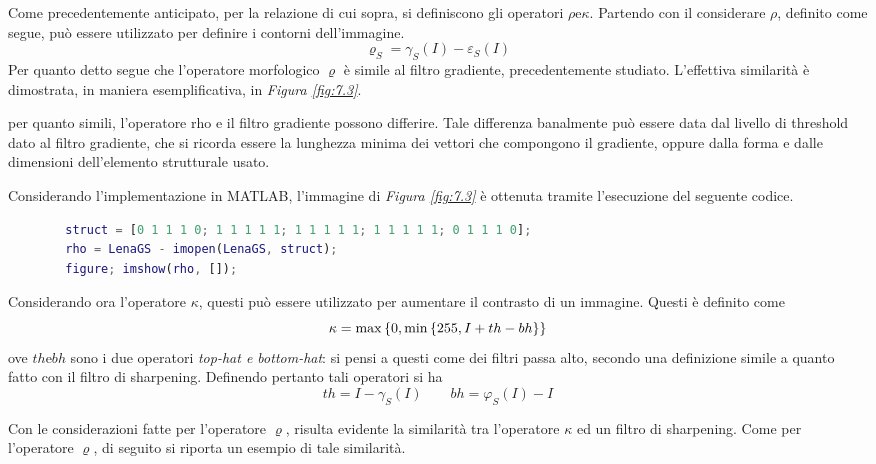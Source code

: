 \documentclass{subfiles}
\begin{document}
Come precedentemente anticipato, per la relazione di cui sopra, si definiscono gli operatori \(\rho \text{e} \kappa\).
Partendo con il considerare \(\rho\), definito come segue, può essere utilizzato per definire i contorni dell'immagine.
\[
    \varrho_{S} = \gamma_{S}(I) - \varepsilon_{S}(I)
\]
Per quanto detto segue che l'operatore morfologico \(\varrho\) è simile al filtro gradiente, precedentemente studiato.
L'effettiva similarità è dimostrata, in maniera esemplificativa, in \emph{Figura \ref{fig:7.3}}.


\begin{Remark*}
    per quanto simili, l'operatore rho e il filtro gradiente possono differire.
    Tale differenza banalmente può essere data dal livello di threshold dato al filtro gradiente, che si ricorda essere la lunghezza minima dei vettori che compongono il gradiente,
    oppure dalla forma e dalle dimensioni dell'elemento strutturale usato.
\end{Remark*}

Considerando l'implementazione in MATLAB, l'immagine di \emph{Figura \ref{fig:7.3}} è ottenuta tramite l'esecuzione del seguente codice.
\begin{center}
    \begin{lstlisting}[language = MATLAB]
        % caricamento di LenaGS
        struct = [0 1 1 1 0; 1 1 1 1 1; 1 1 1 1 1; 1 1 1 1 1; 0 1 1 1 0];
        rho = LenaGS - imopen(LenaGS, struct);
        figure; imshow(rho, []);
    \end{lstlisting}
\end{center}

Considerando ora l'operatore \(\kappa\), questi può essere utilizzato per aumentare il contrasto di un immagine. Questi è definito come
\[
    \kappa = \max\left\{0, \min\left\{255, I + th - bh\right\}\right\}
\]
ove \(th \text{e} bh\) sono i due operatori \emph{top-hat \emph{e} bottom-hat}: si pensi a questi come dei filtri passa alto,
secondo una definizione simile a quanto fatto con il filtro di sharpening. Definendo pertanto tali operatori si ha
\[
    th = I - \gamma_{S}(I) \qquad bh = \varphi_{S}(I) - I
\]
\clearpage

Con le considerazioni fatte per l'operatore \(\varrho\), risulta evidente la similarità tra l'operatore \(\kappa\) ed un filtro di sharpening.
Come per l'operatore \(\varrho\), di seguito si riporta un esempio di tale similarità.

\end{document}
